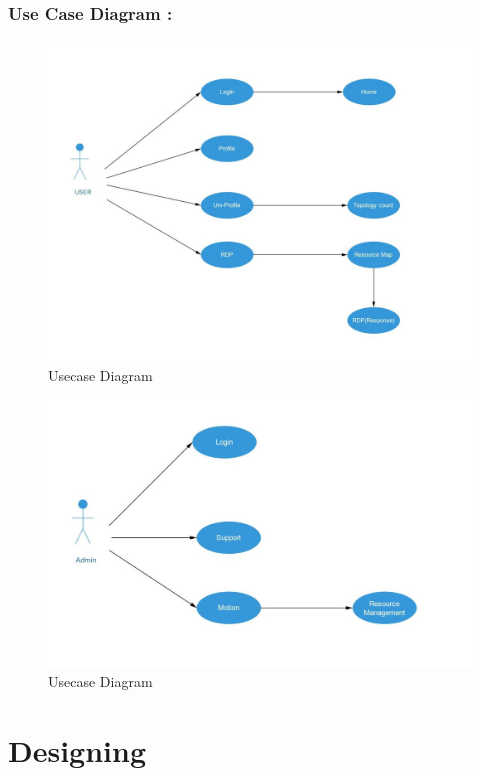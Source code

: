 \documentclass[12pt,a4paper,final,oneside]{report}
\begin{document}
	\subsubsection{Use Case Diagram :}
\begin{figure}[h]
\centering
\includegraphics[width=1.2\linewidth,angle=0]{usecase1.jpg}
\caption{Usecase Diagram}
\end{figure}
\begin{figure}
		\centering	\includegraphics[width=1.2\linewidth,angle=0]
		{usecase2.jpg}
		\caption{Usecase Diagram}
	\end{figure}
	\newpage
	
\section{Designing }
\end{document}
